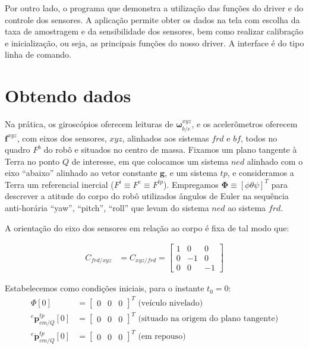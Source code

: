 Por outro lado, o programa que demonstra a utilização das funções do driver e do controle dos sensores. A aplicação permite obter os dados na tela com escolha da taxa de amostragem e da sensibilidade dos sensores, bem como realizar calibração e inicialização, ou seja, as principais funções do nosso driver. A interface é do tipo linha de comando.

\section{Obtendo dados}

Na prática, os giroscópios  oferecem leituras de \(\mathbf{\omega}^{xyz}_{b/e}\), e os acelerômetros oferecem \(\mathbf{f}^{xyz}\), com eixos dos sensores, \(xyz\), alinhados aos sistemas \(frd\) e \(bf\), todos no quadro \(F^{b}\) do robô e situados no centro de massa. Fixamos um plano tangente à Terra no ponto \(Q\) de interesse, em que colocamos um sistema \(ned\) alinhado com o eixo ``abaixo'' alinhado ao vetor constante \(\mathbf{g}\), e um sistema \(tp\), e consideramos a Terra um referencial inercial (\(F^{i} \equiv F^{e}\equiv F^{tp}\)). Empregamos \(\mathbf{\Phi} \equiv \left[\phi \theta \psi \right]^T \) para descrever a atitude do corpo do robô utilizados ângulos de Euler na sequência anti-horária ``yaw'', ``pitch'', ``roll'' que levam do sistema \(ned\) ao sistema \(frd\).

A orientação do eixo dos sensores em relação ao corpo é fixa de tal modo que:

\begin{align*}
    {{C}_{frd/xyz}} &= {{C}_{xyz/frd}}  = \begin{bmatrix} 1 & 0 & 0 \\ 0 & -1 & 0 \\ 0 & 0 & -1 \end{bmatrix}
\end{align*}


Estabelecemos como condições iniciais, para o instante \(t_{0} = 0\):
\begin{align*}
    {\Phi} \left[0\right]
        &= \begin{bmatrix} 0 & 0 & 0 \end{bmatrix}^{T} \text{ (veículo nivelado)} \\
    {^{e}{\mathbf{p}^{tp}_{cm/Q}}\left[0\right]}
    &= \begin{bmatrix} 0 & 0 & 0 \end{bmatrix}^{T} \text{ (situado na origem do plano tangente)} \\
    {^{e}{\dot{\mathbf{p}}^{tp}_{cm/Q}}\left[0\right]}
    &= \begin{bmatrix} 0 & 0 & 0 \end{bmatrix}^{T} \text{ (em repouso)} \\
\end{align*}

